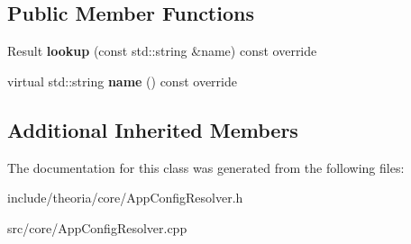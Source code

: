 \subsection*{Public Member Functions}
\begin{DoxyCompactItemize}
\item 
\hypertarget{classtheoria_1_1core_1_1AppConfigResolver_a7922df9559e63ccd91db5177224823fc}{Result {\bfseries lookup} (const std\+::string \&name) const override}\label{classtheoria_1_1core_1_1AppConfigResolver_a7922df9559e63ccd91db5177224823fc}

\item 
\hypertarget{classtheoria_1_1core_1_1AppConfigResolver_ad7c8c08e622613c6505418774a71abda}{virtual std\+::string {\bfseries name} () const override}\label{classtheoria_1_1core_1_1AppConfigResolver_ad7c8c08e622613c6505418774a71abda}

\end{DoxyCompactItemize}
\subsection*{Additional Inherited Members}


The documentation for this class was generated from the following files\+:\begin{DoxyCompactItemize}
\item 
include/theoria/core/App\+Config\+Resolver.\+h\item 
src/core/App\+Config\+Resolver.\+cpp\end{DoxyCompactItemize}
